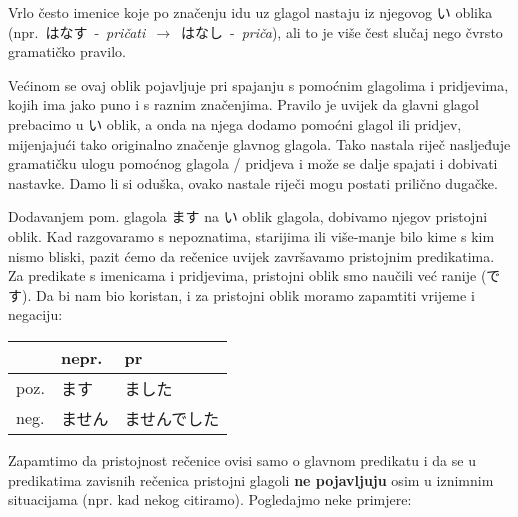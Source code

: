 	
	Vrlo često imenice koje po značenju idu uz glagol nastaju iz njegovog い oblika (npr.~はなす~-~\textit{pričati}~$\rightarrow$~はなし~-~\textit{priča}), ali to je više čest slučaj nego čvrsto gramatičko pravilo.
	
	\vspace{5pt}
	Većinom se ovaj oblik pojavljuje pri spajanju s pomoćnim glagolima i pridjevima, kojih ima jako puno i s raznim značenjima. Pravilo je uvijek da glavni glagol prebacimo u い oblik, a onda na njega dodamo pomoćni glagol ili pridjev, mijenjajući tako originalno značenje glavnog glagola. Tako nastala riječ nasljeđuje gramatičku ulogu pomoćnog glagola / pridjeva i može se dalje spajati i dobivati nastavke. Damo li si oduška, ovako nastale riječi mogu postati prilično dugačke.

	
	Dodavanjem pom. glagola ます na い oblik glagola, dobivamo njegov pristojni oblik. Kad razgovaramo s nepoznatima, starijima ili više-manje bilo kime s kim nismo bliski, pazit ćemo da rečenice uvijek završavamo pristojnim predikatima. Za predikate s imenicama i pridjevima, pristojni oblik smo naučili već ranije (です). Da bi nam bio koristan, i za pristojni oblik moramo zapamtiti vrijeme i negaciju:
	
	\begin{table}[h]
		\centering
		\begin{tabular}{l | l l}%
			& nepr. & pr \\
			\midrule
			poz. & ます & ました \\
			neg. & ません & ませんでした \\
		\end{tabular}
	\end{table}

	Zapamtimo da pristojnost rečenice ovisi samo o glavnom predikatu i da se u predikatima zavisnih rečenica pristojni glagoli \textbf{ne pojavljuju} osim u iznimnim situacijama (npr. kad nekog citiramo). Pogledajmo neke primjere:
	
	\begin{reibun}
	\end{reibun}

